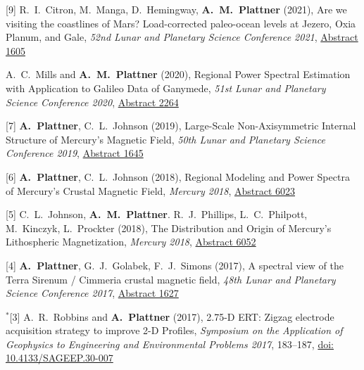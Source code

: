 \documentclass[10pt]{article}
\begin{document}
\spcp
\hspace{-0.5cm}[9] R.~I.~Citron, M.~Manga, D.~Hemingway, \textbf{A.~M.~Plattner} (2021),
Are we visiting the coastlines of Mars? Load-corrected paleo-ocean levels at Jezero, Oxia Planum, and Gale,
\emph{52nd Lunar and Planetary Science Conference 2021},
\href{https://www.hou.usra.edu/meetings/lpsc2021/pdf/1605.pdf}{Abstract 1605}

\spcp
\hspace{-0.77cm} \gr[8] A.~C.~Mills and \textbf{A.~M.~Plattner}
(2020),
Regional Power Spectral Estimation with Application to Galileo Data of Ganymede,
\emph{51st Lunar and Planetary Science Conference 2020},
\href{https://www.hou.usra.edu/meetings/lpsc2020/pdf/2264.pdf}{Abstract 2264}

\spcp
\hspace{-0.5cm}[7] \textbf{A.~Plattner}, C.~L.~Johnson (2019), Large-Scale Non-Axisymmetric Internal Structure of Mercury's Magnetic Field,
\emph{50th Lunar and Planetary Science Conference 2019},
\href{https://www.hou.usra.edu/meetings/lpsc2019/pdf/1645.pdf}{Abstract 1645}


\spcp
\hspace{-0.5cm}[6] \textbf{A.~Plattner}, C.~L.~Johnson (2018),
Regional Modeling and Power Spectra of Mercury's Crustal Magnetic Field,
\emph{Mercury 2018},
\href{https://www.hou.usra.edu/meetings/mercury2018/pdf/6023.pdf}{Abstract 6023}

\spcp
\hspace{-0.5cm}[5] C.~L.~Johnson,
\textbf{A.~M.~Plattner}. R.~J.~Phillips, L.~C.~Philpott, M.~Kinczyk,
L.~Prockter (2018), The Distribution and Origin of Mercury's Lithospheric Magnetization, \emph{Mercury 2018},
\href{https://www.hou.usra.edu/meetings/mercury2018/pdf/6052.pdf}{Abstract
  6052}

\spcp
\hspace{-0.5cm}[4] \textbf{A.~Plattner}, G.~J.~Golabek, F.~J.~Simons (2017),
A spectral view of the Terra Sirenum / Cimmeria crustal magnetic
field,
\emph{48th Lunar and Planetary Science Conference 2017},
\href{http://www.lpi.usra.edu/meetings/lpsc2017/pdf/1627.pdf}{Abstract 1627}

\spcp
\hspace{-0.67cm}$^*$[3] A.~R.~Robbins and \textbf{A.~Plattner}
(2017),
2.75-D ERT: Zigzag electrode acquisition strategy to improve 2-D
Profiles,
\emph{Symposium on the Application of Geophysics to Engineering and
  Environmental Problems 2017}, 183--187,
\href{http://library.seg.org/doi/pdf/10.4133/SAGEEP.30-007}{doi: 10.4133/SAGEEP.30-007}
\end{document}
